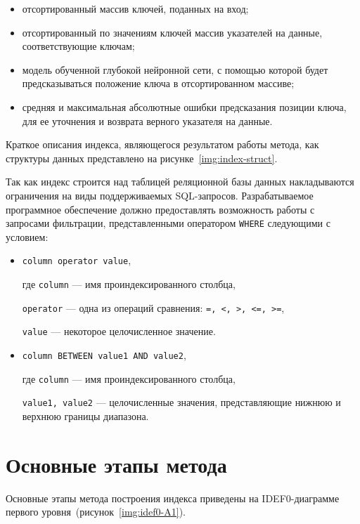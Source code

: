 \begin{itemize}
    \item отсортированный массив ключей, поданных на вход;
    \item отсортированный по значениям ключей массив указателей
        на данные, соответствующие ключам;
    \item модель обученной глубокой нейронной сети, с помощью которой будет
        предсказываться положение ключа в отсортированном массиве;
    \item средняя и максимальная абсолютные ошибки предсказания позиции ключа,
        для ее уточнения и возврата верного указателя на данные.
\end{itemize}

Краткое описания индекса, являющегося результатом работы метода, как структуры
данных представлено на рисунке~\ref{img:index-struct}.


Так как индекс строится над таблицей реляционной базы данных накладываются
ограничения на виды поддерживаемых SQL-запросов. Разрабатываемое программное
обеспечение должно предоставлять возможность работы с запросами фильтрации,
представленными оператором \texttt{WHERE} следующими с условием:

\begin{itemize}
    \item \texttt{column operator value},

        где \texttt{column} --- имя проиндексированного столбца,

        \texttt{operator} --- одна из операций сравнения: \texttt{=, <, >, <=, >=},

        \texttt{value} --- некоторое целочисленное значение.

    \item \texttt{column BETWEEN value1 AND value2},
        
        где \texttt{column} --- имя проиндексированного столбца,

        \texttt{value1, value2} --- целочисленные значения, представляющие
        нижнюю и верхнюю границы диапазона.
\end{itemize}

\section{Основные этапы метода}

Основные этапы метода построения индекса приведены на IDEF0-диаграмме первого
уровня~(рисунок~\ref{img:idef0-A1}). 

